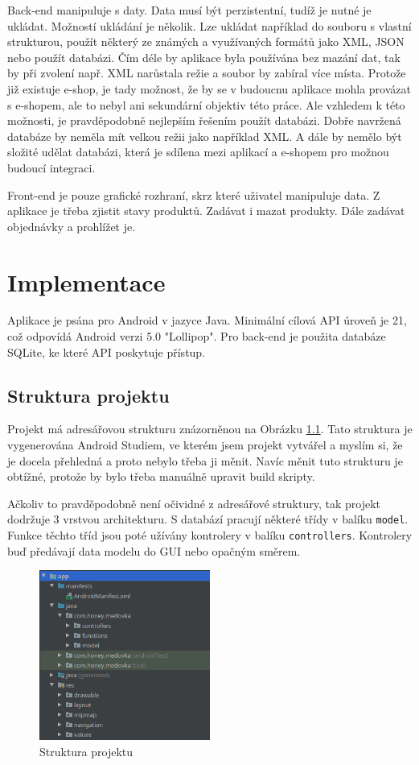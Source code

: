 \documentclass[12pt]{report}
\begin{document}
Back-end manipuluje s daty. Data musí být perzistentní, tudíž je nutné je ukládat.
Možností ukládání je několik. Lze ukládat například do souboru s vlastní strukturou, použít
některý ze známých a využívaných formátů jako XML, JSON nebo použít databázi. Čím déle by 
aplikace byla používána bez mazání dat, tak by při zvolení např. XML narůstala režie a soubor by 
zabíral více místa.
Protože již existuje e-shop, je tady možnost, že by se v budoucnu aplikace mohla provázat s e-shopem, ale
to nebyl ani sekundární objektiv této práce. Ale vzhledem k této možnosti, je pravděpodobně nejlepším
řešením použít databázi. Dobře navržená databáze by neměla mít velkou režii jako například XML. A dále
by nemělo být složité udělat databázi, která je sdílena mezi aplikací a e-shopem pro možnou budoucí
integraci.

Front-end je pouze grafické rozhraní, skrz které uživatel manipuluje data. Z aplikace je třeba zjistit
stavy produktů. Zadávat i mazat produkty. Dále zadávat objednávky a prohlížet je.
%
\chapter{Implementace}
Aplikace je psána pro Android v jazyce Java. Minimální cílová API úroveň je 21, což odpovídá Android
verzi 5.0 "Lollipop". Pro back-end je použita databáze SQLite, ke které API poskytuje přístup.
\section{Struktura projektu}
Projekt má adresářovou strukturu znázorněnou na Obrázku \ref{img:project_struct}. Tato struktura
je vygenerována Android Studiem, ve kterém jsem projekt vytvářel a myslím si, že je docela přehledná a proto
nebylo třeba ji měnit. Navíc měnit tuto strukturu je obtížné, protože by bylo třeba manuálně upravit build 
skripty.

Ačkoliv to pravděpodobně není očividné z adresářové struktury, tak projekt dodržuje 3 vrstvou architekturu.
S databází pracují některé třídy v balíku \texttt{model}. Funkce těchto tříd jsou poté užívány kontrolery
v balíku \texttt{controllers}. Kontrolery buď předávají data modelu do GUI nebo opačným směrem.

\begin{figure}[H]
        \centering
        \includegraphics[width=0.5\textwidth]{img/dir_structure.png}
        \caption{Struktura projektu}
        \label{img:project_struct}
\end{figure}
%
\end{document}

